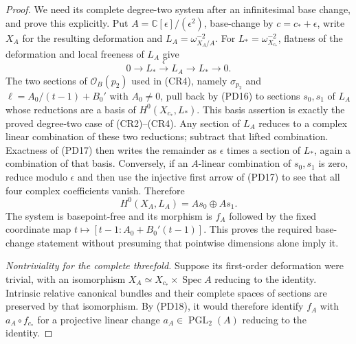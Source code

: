 \begin{proof}
We need its complete degree-two system after an infinitesimal base
change, and prove this explicitly. Put
$A=\mathbb C[\epsilon]/(\epsilon^2)$, base-change by
$c=c_*+\epsilon$, write $X_A$ for the resulting deformation and
$L_A=\omega_{X_A/A}^{-2}$. For $L_*=\omega_{X_{c_*}}^{-2}$,
flatness of the deformation and local freeness of $L_A$ give
\[
 0\longrightarrow L_*\xrightarrow{\ \epsilon\ }L_A
        \longrightarrow L_*\longrightarrow0.
 \tag{PD17}
\]
The two sections of $\mathcal O_B(p_2)$ used in (CR4), namely
$\sigma_{p_2}$ and $\ell=A_0/(t-1)+B_0'$ with $A_0\ne0$,
pull back by (PD16) to sections $s_0,s_1$ of $L_A$ whose reductions
are a basis of $H^0(X_{c_*},L_*)$. This basis assertion is exactly
the proved degree-two case of (CR2)--(CR4).
Any section of $L_A$ reduces to a complex linear combination of these
two reductions; subtract that lifted combination. Exactness of (PD17)
then writes the remainder as $\epsilon$ times a section of $L_*$,
again a combination of that basis. Conversely, if an $A$-linear
combination of $s_0,s_1$ is zero, reduce modulo $\epsilon$ and then
use the injective first arrow of (PD17) to see that all four complex
coefficients vanish. Therefore
\[
 H^0(X_A,L_A)=A s_0\oplus A s_1.
 \tag{PD18}
\]
The system is basepoint-free and its morphism is $f_A$ followed by
the fixed coordinate map $t\mapsto[t-1:A_0+B_0'(t-1)]$.
This proves the required base-change statement without presuming that
pointwise dimensions alone imply it.

\emph{Nontriviality for the complete threefold.}
Suppose its first-order deformation were trivial, with an isomorphism
$X_A\simeq X_{c_*}\times\operatorname{Spec}A$ reducing to the identity.
Intrinsic relative canonical bundles and their complete spaces of
sections are preserved by that isomorphism. By (PD18), it would
therefore identify $f_A$ with $a_A\circ f_{c_*}$ for a projective
linear change $a_A\in\operatorname{PGL}_2(A)$ reducing to the identity.


\end{proof}
